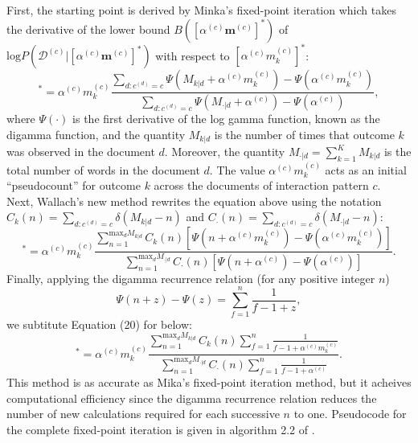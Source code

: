 \documentclass[a4paper]{article}
\begin{document}
\newline First, the starting point is derived by Minka’s fixed-point iteration which takes the derivative of the lower bound $B([\alpha^{(c)}\boldsymbol{m}^{(c)}]^*)$ of $\mbox{log}P(\mathcal{D}^{(c)}|[\alpha^{(c)}\boldsymbol{m}^{(c)}]^*)$ with respect to $[\alpha^{(c)} {m^{(c)}_k}]^*$:
\begin{equation}
[\alpha^{(c)} m^{(c)}_k]^*=\alpha^{(c)} m^{(c)}_k\frac{\sum_{d:c^{(d)}=c}\Psi(M_{k|d}+\alpha^{(c)} m^{(c)}_k)-\Psi(\alpha^{(c)} m^{(c)}_k)}{\sum_{d:c^{(d)}=c}\Psi(M_{\cdot|d}+\alpha^{(c)})-\Psi(\alpha^{(c)})},
\end{equation}
where $\Psi(\cdot)$ is the first derivative of the log gamma function, known as the digamma function, and the quantity $M_{k|d}$ is the number of times that outcome $k$ was observed in the document $d$. Moreover, the quantity $M_{\cdot|d}=\sum_{k=1}^K M_{k|d}$ is the total number of words in the document $d$. The
value $\alpha^{(c)} m^{(c)}_k$ acts as an initial “pseudocount” for outcome $k$ across the documents of interaction pattern $c$.\\ \newline
Next, Wallach's new method rewrites the equation above using the notation $C_k(n)=\sum\limits_{d:c^{(d)}=c}\delta(M_{k|d}-n)$ and $C_\cdot(n)=\sum\limits_{d:c^{(d)}=c}\delta(M_{\cdot|d}-n)$:
\begin{equation}
[\alpha^{(c)} m^{(c)}_k]^*=\alpha^{(c)} m^{(c)}_k\frac{\sum_{n=1}^{\mbox{max}_dM_{k|d}}C_k(n)[\Psi(n+\alpha^{(c)} m^{(c)}_k)-\Psi(\alpha^{(c)} m^{(c)}_k)]}{\sum_{n=1}^{\mbox{max}_dM_{\cdot|d}}C_\cdot(n)[\Psi(n+\alpha^{(c)})-\Psi(\alpha^{(c)})]}.
\end{equation}
Finally, applying the digamma recurrence relation (for any positive integer $n$) $$\Psi(n+z)-\Psi(z)=\sum_{f=1}^{n}\frac{1}{f-1+z},$$ we subtitute Equation (20) for below:
\begin{equation}
[\alpha^{(c)} m^{(c)}_k]^*=\alpha^{(c)} m^{(c)}_k\frac{\sum_{n=1}^{\mbox{max}_dM_{k|d}}C_k(n)\sum_{f=1}^n \frac{1}{f-1+\alpha^{(c)} m^{(c)}_k}}{\sum_{n=1}^{\mbox{max}_dM_{\cdot|d}}C_\cdot(n)\sum_{f=1}^n \frac{1}{f-1+\alpha^{(c)}}}.
\end{equation}
This method is as accurate as Mika's fixed-point iteration method, but it acheives computational efficiency since the digamma recurrence relation reduces the number of new calculations required for each successive $n$ to one. Pseudocode
for the complete fixed-point iteration is given in algorithm 2.2 of \cite{wallach2008structured}.
\end{document}
